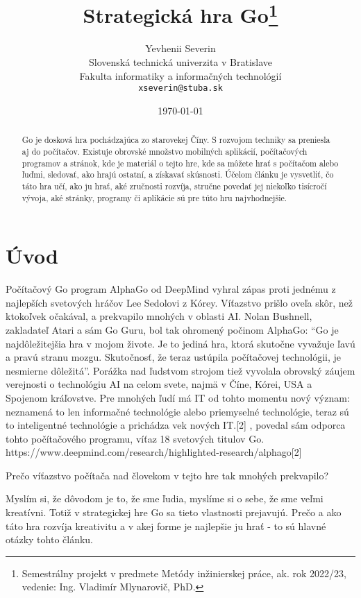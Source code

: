 \documentclass[10pt,twoside,slovak,a4paper]{article}
\title{Strategická hra Go\thanks{Semestrálny projekt v predmete Metódy inžinierskej práce, ak. rok 2022/23, vedenie: Ing. Vladimír Mlynarovič, PhD.}}
\author{Yevhenii Severin\\[2pt]
	{\small Slovenská technická univerzita v Bratislave}\\
	{\small Fakulta informatiky a informačných technológií}\\
	{\small \texttt{xseverin@stuba.sk}}
	}
\date{\small \today}
\begin{document}
\maketitle

\begin{abstract}
Go je dosková hra pochádzajúca zo starovekej Číny. S rozvojom techniky sa preniesla aj do počítačov.
Existuje obrovské množstvo mobilných aplikácií, počítačových programov a stránok, kde je materiál o tejto hre, kde sa môžete hrať s počítačom alebo ľuďmi, sledovať, ako hrajú ostatní, a získavať skúsnosti.
Účelom článku je vysvetliť, čo táto hra učí, ako ju hrať, aké zručnosti rozvíja, stručne povedať jej niekoľko tisícročí vývoja, aké stránky, programy či aplikácie sú pre túto hru najvhodnejšie.
\end{abstract}



\section{Úvod}

Počítačový Go program AlphaGo od DeepMind vyhral zápas proti jednému z najlepších svetových hráčov Lee Sedolovi z Kórey. Víťazstvo prišlo oveľa skôr, než ktokoľvek očakával, a prekvapilo mnohých v oblasti AI. Nolan Bushnell, zakladateľ Atari a sám Go Guru, bol tak ohromený počinom AlphaGo: \enquote{Go je najdôležitejšia hra v mojom živote. Je to jediná hra, ktorá skutočne vyvažuje ľavú a pravú stranu mozgu.  Skutočnosť, že teraz ustúpila počítačovej technológii, je nesmierne dôležitá}. Porážka nad ľudstvom strojom tiež vyvolala obrovský záujem verejnosti o technológiu AI na celom svete, najmä v Číne, Kórei, USA a Spojenom kráľovstve. Pre mnohých ľudí má IT od tohto momentu nový význam: neznamená to len informačné technológie alebo priemyselné technológie, teraz sú to inteligentné technológie a prichádza vek nových IT.[2]
, povedal sám odporca tohto počítačového programu, víťaz 18 svetových titulov Go. https://www.deepmind.com/research/highlighted-research/alphago[2]

Prečo víťazstvo počítača nad človekom v tejto hre tak mnohých prekvapilo?

Myslím si, že dôvodom je to, že sme ľudia, myslíme si o sebe, že sme veľmi kreatívni. Totiž v strategickej hre Go sa tieto vlastnosti prejavujú. Prečo a ako táto hra rozvíja kreativitu a v akej forme je najlepšie ju hrať - to sú hlavné otázky tohto článku.
\end{document}
